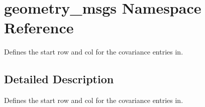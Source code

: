 \hypertarget{namespacegeometry__msgs}{\section{geometry\-\_\-msgs Namespace Reference}
\label{namespacegeometry__msgs}
}


Defines the start row and col for the covariance entries in.  




\subsection{Detailed Description}
Defines the start row and col for the covariance entries in. 